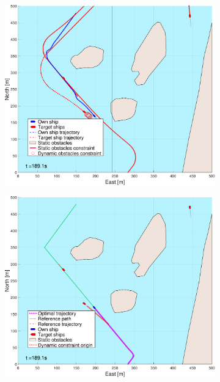 \begin{figure}[ht]
\begin{subfigure}[b]{0.494\textwidth}
        \subcaption{}
    \end{subfigure}
    \hfill
    \\
    \begin{subfigure}[b]{0.494\textwidth}
        \centering
        \includegraphics[width=\textwidth]{Images/NewFigures/Helloya_Rev/_Simple_1fig1_time=190}
        \subcaption{}
    \end{subfigure}
    \hfill
    \begin{subfigure}[b]{0.494\textwidth}
        \centering
        \includegraphics[width=\textwidth]{Images/NewFigures/Helloya_Rev/_Simple_1fig999_time=190}

\end{subfigure}
\end{figure}
